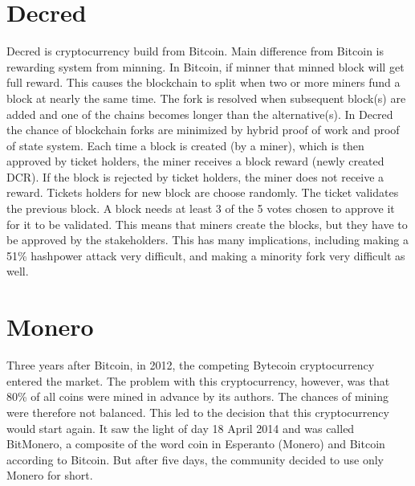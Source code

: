\section{Decred}
Decred is cryptocurrency build from Bitcoin. Main difference from Bitcoin is rewarding system from minning. In Bitcoin, if minner that minned block will get full reward. This causes the blockchain to split when two or more miners fund a block at nearly the same time. The fork is resolved when subsequent block(s) are added and one of the chains becomes longer than the alternative(s). In Decred the chance of blockchain forks are minimized by  hybrid proof of work and proof of state system. Each time a block is created (by a miner), which is then approved by ticket holders, the miner receives a block reward (newly created DCR). If the block is rejected by ticket holders, the miner does not receive a reward. Tickets holders for new block are choose randomly. The ticket validates the previous block. A block needs at least 3 of the 5 votes chosen to approve it for it to be validated. This means that miners create the blocks, but they have to be approved by the stakeholders. This has many implications, including making a 51\% hashpower attack very difficult, and making a minority fork very difficult as well.

\section{Monero}
Three years after Bitcoin, in 2012, the competing Bytecoin cryptocurrency entered the market. The problem with this cryptocurrency, however, was that 80\% of all coins were mined in advance by its authors. The chances of mining were therefore not balanced. This led to the decision that this cryptocurrency would start again. It saw the light of day 18 April 2014 and was called BitMonero, a composite of the word coin in Esperanto (Monero) and Bitcoin according to Bitcoin. But after five days, the community decided to use only Monero for short.
